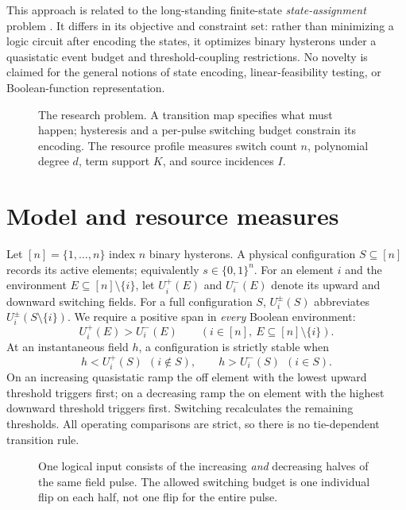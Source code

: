 \documentclass[12pt,letterpaper]{article}
\theoremstyle{definition}\newtheorem{definition}[theorem]{Definition}
\theoremstyle{remark}\newtheorem{remark}[theorem]{Remark}
\newcommand{\bits}{\{0,1\}}
\begin{document}
This approach is related to the long-standing finite-state \emph{state-assignment} problem \citep{ahmad2000}. It differs in its objective and constraint set: rather than minimizing a logic circuit after encoding the states, it optimizes binary hysterons under a quasistatic event budget and threshold-coupling restrictions. No novelty is claimed for the general notions of state encoding, linear-feasibility testing, or Boolean-function representation.

\begin{figure}[H]
\centering
\resizebox{.98\linewidth}{!}{}
\caption{The research problem. A transition map specifies what must happen; hysteresis and a per-pulse switching budget constrain its encoding. The resource profile measures switch count $n$, polynomial degree $d$, term support $K$, and source incidences $I$.}
\label{fig:overview}
\end{figure}

\section{Model and resource measures}\label{sec:model}
Let $[n]=\{1,\ldots,n\}$ index $n$ binary hysterons. A physical configuration $S\subseteq[n]$ records its active elements; equivalently $s\in\bits^n$. For an element $i$ and the environment $E\subseteq[n]\setminus\{i\}$, let $U_i^+(E)$ and $U_i^-(E)$ denote its upward and downward switching fields. For a full configuration $S$, $U_i^{\pm}(S)$ abbreviates $U_i^{\pm}(S\setminus\{i\})$. We require a positive span in \emph{every} Boolean environment:
\begin{equation}\label{eq:span}
 U_i^+(E)>U_i^-(E) \qquad (i\in[n],\ E\subseteq[n]\setminus\{i\}).
\end{equation}
At an instantaneous field $h$, a configuration is strictly stable when
\begin{equation}\label{eq:stable}
 h<U_i^+(S)\ \ (i\notin S), \qquad h>U_i^-(S)\ \ (i\in S).
\end{equation}
On an increasing quasistatic ramp the off element with the lowest upward threshold triggers first; on a decreasing ramp the on element with the highest downward threshold triggers first. Switching recalculates the remaining thresholds. All operating comparisons are strict, so there is no tie-dependent transition rule.

\begin{figure}[ht]
\centering\resizebox{\linewidth}{!}{}
\caption{One logical input consists of the increasing \emph{and} decreasing halves of the same field pulse. The allowed switching budget is one individual flip on each half, not one flip for the entire pulse.}
\label{fig:pulse}
\end{figure}
\end{document}
